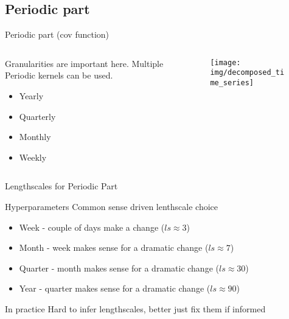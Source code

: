 \documentclass{beamer}
\begin{document}
\subsection{Periodic part}
\begin{frame}{Periodic part (cov function)}
    \begin{columns}
        \begin{column}{0.5\linewidth}
        Granularities are important here. Multiple Periodic kernels can be used.
            \begin{itemize}
                \item Yearly
                \item Quarterly
                \item Monthly
                \item Weekly
            \end{itemize}
        \end{column}
        \begin{column}{0.5\linewidth}
        \begin{figure}
            \centering
            \texttt{[image: img/decomposed\_time\_series]}
        \end{figure}
        \end{column}
    \end{columns}
\end{frame}
\begin{frame}{Lengthscales for Periodic Part}
    \begin{block}{Hyperparameters}
        Common sense driven lenthscale choice
    \end{block}
    \begin{itemize}
        \item Week - couple of days make a change ($ls\approx3$)
        \item Month - week makes sense for a dramatic change ($ls\approx7$)
        \item Quarter - month makes sense for a dramatic change ($ls\approx30$)
        \item Year - quarter makes sense for a dramatic change ($ls\approx90$)
    \end{itemize}
    \pause
    \begin{alertblock}{In practice}
        Hard to infer lengthscales, better just fix them if informed
    \end{alertblock}
\end{frame}
\end{document}
